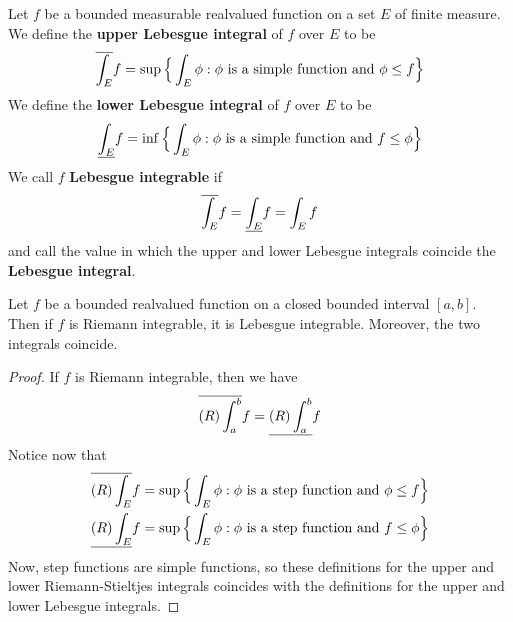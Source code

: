 \begin{definition}
    Let $f$ be a bounded measurable realvalued function on a set  $E$ of finite
    measure. We define the  \textbf{upper Lebesgue integral} of $f$ over  $E$ to
    be
    \begin{equation*}
        \bar{\int_E}{f}=\sup{\Big{\{} \int_E{\phi} : \phi \text{ is a simple
                    function and } \phi \leq f \Big\}{}}
    \end{equation*}
    We define the \textbf{lower Lebesgue integral} of $f$ over  $E$ to be
    \begin{equation*}
        \bbar{\int_E}{f}=\inf{\Big{\{} \int_E{\phi} : \phi \text{ is a simple
                    function and } f \leq \phi \Big\}{}}
    \end{equation*}
    We call $f$  \textbf{Lebesgue integrable} if
    \begin{equation*}
        \bar{\int_E}{f}=\bbar{\int_E}{f}=\int_E{f}
    \end{equation*}
    and call the value in which the upper and lower Lebesgue integrals coincide
    the \textbf{Lebesgue integral}.
\end{definition}

\begin{theorem}\label{10.1.3}
    Let $f$ be a bounded realvalued function on a closed bounded interval
    $[a,b]$. Then if $f$ is Riemann integrable, it is Lebesgue integrable.
    Moreover, the two integrals coincide.
\end{theorem}
\begin{proof}
    If $f$ is Riemann integrable, then we have
    \begin{equation*}
        \bar{(R)\int_a^b}{f}=\bbar{(R)\int_a^b}{f}
    \end{equation*}
    Notice now that
    \begin{align*}
        \bar{(R)\int_E}{f} &=  \sup{\Big{\{} \int_E{\phi} : \phi \text{ is a
                    step function and } \phi \leq f \Big\}{}}   \\
        \bbar{(R)\int_E}{f} &=  \sup{\Big{\{} \int_E{\phi} : \phi \text{ is a
                    step function and } f \leq \phi \Big\}{}}   \\
    \end{align*}
    Now, step functions are simple functions, so these definitions for the upper
    and lower Riemann-Stieltjes integrals coincides with the definitions for the
    upper and lower Lebesgue integrals.
\end{proof}


